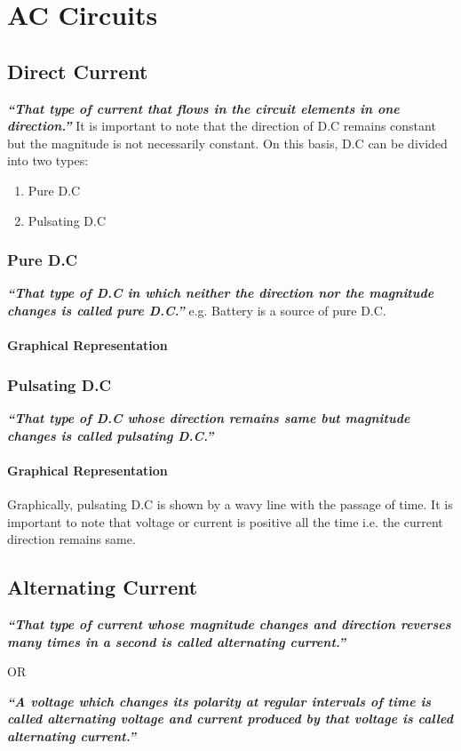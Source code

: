 \chapter{AC Circuits}
\label{15}
\section{Direct Current}
\textit{\textbf{“That type of current that flows in the circuit 
elements in one direction.”}}
It is important to note that the direction of D.C remains constant
but the magnitude is not necessarily constant. On this basis, D.C
can be divided into two types:
\begin{enumerate}
    \item Pure D.C
    \item Pulsating D.C
\end{enumerate}
\subsection{Pure D.C}
\textit{\textbf{“That type of D.C in which neither the direction nor 
the magnitude changes is called pure D.C.”}}   
\newline
e.g. Battery is a source of pure D.C.
\subsubsection{Graphical Representation}

\subsection{Pulsating D.C}
\textit{\textbf{“That type of D.C whose direction remains same
but magnitude changes is called pulsating D.C.”}} 
\subsubsection{Graphical Representation}
Graphically, pulsating D.C is shown by a wavy line with the passage of
time. It is important to note that voltage or current is positive
all the time i.e. the current direction remains same.

\section{Alternating Current}
\textit{\textbf{“That type of current whose magnitude changes
and direction reverses many times in a second is called
alternating current.”}}
\begin{center}
    OR
\end{center}
\textit{\textbf{“A voltage which changes its polarity at regular
intervals of time is called alternating voltage and current
produced by that voltage is called alternating current.”}}

